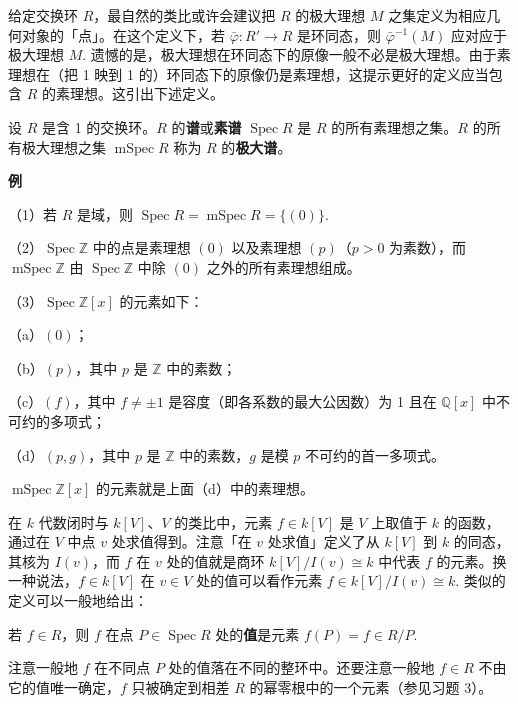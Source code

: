 给定交换环 \(R\)，最自然的类比或许会建议把 \(R\) 的极大理想 \(M\) 之集定义为相应几何对象的「点」。在这个定义下，若 \(\bar\varphi : R' \to R\) 是环同态，则 \(\bar\varphi^{-1}(M)\) 应对应于极大理想 \(M\). 遗憾的是，极大理想在环同态下的原像一般不必是极大理想。由于素理想在（把 1 映到 1 的）环同态下的原像仍是素理想，这提示更好的定义应当包含 \(R\) 的素理想。这引出下述定义。

\begin{definition}
设 \(R\) 是含 1 的交换环。\(R\) 的\textbf{谱}或\textbf{素谱} \(\operatorname{Spec}R\) 是 \(R\) 的所有素理想之集。\(R\) 的所有极大理想之集 \(\operatorname{mSpec}R\) 称为 \(R\) 的\textbf{极大谱}。
\end{definition}

\noindent\textbf{例}

（1）若 \(R\) 是域，则 \(\operatorname{Spec}R = \operatorname{mSpec}R = \{(0)\}\).

（2）\(\operatorname{Spec}\mathbb{Z}\) 中的点是素理想 \((0)\) 以及素理想 \((p)\)（\(p > 0\) 为素数），而 \(\operatorname{mSpec}\mathbb{Z}\) 由 \(\operatorname{Spec}\mathbb{Z}\) 中除 \((0)\) 之外的所有素理想组成。

（3）\(\operatorname{Spec}\mathbb{Z}[x]\) 的元素如下：

（a）\((0)\)；

（b）\((p)\)，其中 \(p\) 是 \(\mathbb{Z}\) 中的素数；

（c）\((f)\)，其中 \(f \neq \pm1\) 是容度（即各系数的最大公因数）为 1 且在 \(\mathbb{Q}[x]\) 中不可约的多项式；

（d）\((p, g)\)，其中 \(p\) 是 \(\mathbb{Z}\) 中的素数，\(g\) 是模 \(p\) 不可约的首一多项式。

\(\operatorname{mSpec}\mathbb{Z}[x]\) 的元素就是上面（d）中的素理想。

在 \(k\) 代数闭时与 \(k[V]\)、\(V\) 的类比中，元素 \(f \in k[V]\) 是 \(V\) 上取值于 \(k\) 的函数，通过在 \(V\) 中点 \(v\) 处求值得到。注意「在 \(v\) 处求值」定义了从 \(k[V]\) 到 \(k\) 的同态，其核为 \(I(v)\)，而 \(f\) 在 \(v\) 处的值就是商环 \(k[V]/I(v) \cong k\) 中代表 \(f\) 的元素。换一种说法，\(f \in k[V]\) 在 \(v \in V\) 处的值可以看作元素 \(f \in k[V]/I(v) \cong k\). 类似的定义可以一般地给出：

\begin{definition}
若 \(f \in R\)，则 \(f\) 在点 \(P \in \operatorname{Spec}R\) 处的\textbf{值}是元素 \(f(P) = f \in R/P\).
\end{definition}

注意一般地 \(f\) 在不同点 \(P\) 处的值落在不同的整环中。还要注意一般地 \(f \in R\) 不由它的值唯一确定，\(f\) 只被确定到相差 \(R\) 的幂零根中的一个元素（参见习题 3）。

